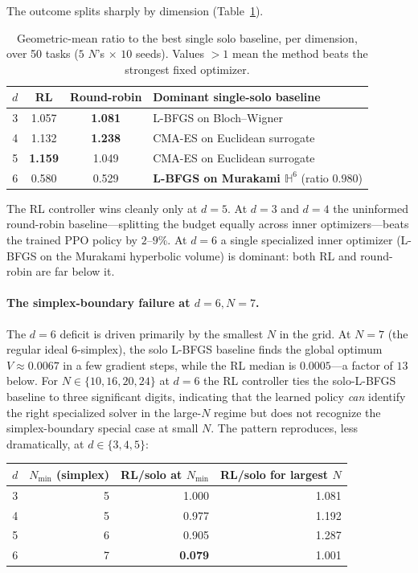 \documentclass[11pt]{article}
\begin{document}
The outcome splits sharply by dimension
(Table~\ref{tab:rl_per_dim}).

\begin{table}[ht]
\centering
\caption{Geometric-mean ratio to the best single solo baseline,
per dimension, over 50 tasks ($5$ $N$'s $\times$ $10$ seeds).
Values $> 1$ mean the method beats the strongest fixed optimizer.}
\label{tab:rl_per_dim}
\smallskip
\begin{tabular}{r c c l}
\toprule
$d$ & RL & Round-robin & Dominant single-solo baseline \\
\midrule
3 & 1.057 & \textbf{1.081} & L-BFGS on Bloch--Wigner \\
4 & 1.132 & \textbf{1.238} & CMA-ES on Euclidean surrogate \\
5 & \textbf{1.159} & 1.049 & CMA-ES on Euclidean surrogate \\
6 & 0.580 & 0.529 & \textbf{L-BFGS on Murakami $\mathbb{H}^6$} (ratio $0.980$) \\
\bottomrule
\end{tabular}
\end{table}

The RL controller wins cleanly only at $d = 5$.  At $d = 3$ and
$d = 4$ the uninformed round-robin baseline---splitting the
budget equally across inner optimizers---beats the trained PPO
policy by $2$--$9\%$.  At $d = 6$ a single specialized
inner optimizer (L-BFGS on the Murakami hyperbolic volume) is
dominant: both RL and round-robin are far below it.

\paragraph{The simplex-boundary failure at $d = 6, N = 7$.}
The $d = 6$ deficit is driven primarily by the smallest $N$ in the
grid.  At $N = 7$ (the regular ideal $6$-simplex), the solo L-BFGS
baseline finds the global optimum $V \approx 0.0067$ in a few
gradient steps, while the RL median is $0.0005$---a factor of $13$
below.  For $N \in \{10, 16, 20, 24\}$ at $d = 6$ the RL controller
ties the solo-L-BFGS baseline to three significant digits,
indicating that the learned policy \emph{can} identify the right
specialized solver in the large-$N$ regime but does not recognize
the simplex-boundary special case at small $N$.  The pattern
reproduces, less dramatically, at $d \in \{3, 4, 5\}$:

\begin{center}
\begin{tabular}{r r r r}
\toprule
$d$ & $N_{\min}$ (simplex) & RL/solo at $N_{\min}$ & RL/solo for largest $N$ \\
\midrule
3 & 5  & 1.000 & 1.081 \\
4 & 5  & 0.977 & 1.192 \\
5 & 6  & 0.905 & 1.287 \\
6 & 7  & \textbf{0.079} & 1.001 \\
\bottomrule
\end{tabular}
\end{center}
\end{document}
